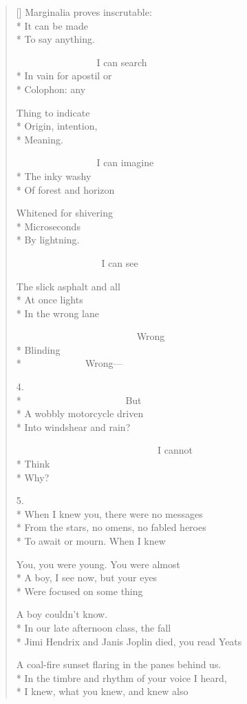\begin{verse}[\versewidth]
Marginalia proves inscrutable:\\*
It can be made\\*
To say anything.

                    I can search\\*
In vain for apostil or\\*
Colophon: any

Thing to indicate\\*
Origin, intention,\\*
Meaning.

                    I can imagine\\*
The inky washy\\*
Of forest and horizon

Whitened for shivering\\*
Microseconds\\*
By lightning.

                     I can see

The slick asphalt and all\\*
At once lights\\*
In the wrong lane

                              Wrong\\*
Blinding\\*
               Wrong---

4.\\*
                         But\\*
A wobbly motorcycle driven\\*
Into windshear and rain?

                                   I cannot\\*
Think\\*
Why?

5.\\*
When I knew you, there were no messages\\*
From the stars, no omens, no fabled heroes\\*
To await or mourn. When I knew

You, you were young. You were almost\\*
A boy, I see now, but your eyes\\*
Were focused on some thing

A boy couldn't know.\\*
In our late afternoon class, the fall\\*
Jimi Hendrix and Janis Joplin died, you read Yeats

A coal-fire sunset flaring in the panes behind us.\\*
In the timbre and rhythm of your voice I heard,\\*
I knew, what you knew, and knew also


\end{verse}
